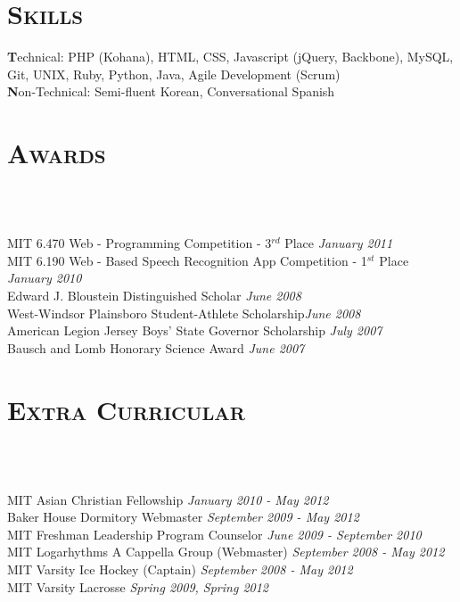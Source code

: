 \begin{resume}
\section{\textsc{Skills}}

\textbf Technical: PHP (Kohana), HTML, CSS, Javascript (jQuery, Backbone), MySQL, Git, UNIX, Ruby, Python, Java, Agile Development (Scrum)\\

\textbf Non-Technical: Semi-fluent Korean, Conversational Spanish

\section{\textsc{Awards}}

\begin{formatb}
  \\
  \body\\
\end{formatb}
MIT 6.470 Web - Programming Competition - 3$^{rd}$ Place \hfill{\em{January 2011}}\\
MIT 6.190 Web - Based Speech Recognition App Competition - 1$^{st}$ Place \hfill{\em{January 2010}}\\
Edward J. Bloustein Distinguished Scholar \hfill{\em{June 2008}}\\
West-Windsor Plainsboro Student-Athlete Scholarship\hfill{\em{June 2008}}\\
American Legion Jersey Boys' State Governor Scholarship \hfill{\em{July 2007}}\\
Bausch and Lomb Honorary Science Award \hfill{\em{June 2007}}

\section{\textsc{Extra Curricular}}
\begin{formatb}
  \\
  \body\\
\end{formatb}
MIT Asian Christian Fellowship \hfill{\em{January 2010 - May 2012}}\\
Baker House Dormitory Webmaster \hfill{\em{September 2009 - May 2012}}\\
MIT Freshman Leadership Program Counselor \hfill{\em{June 2009 - September 2010}}\\
MIT Logarhythms A Cappella Group (Webmaster) \hfill{\em{September 2008 - May 2012}}\\
MIT Varsity Ice Hockey (Captain) \hfill{\em{September 2008 - May 2012}}\\
MIT Varsity Lacrosse \hfill{\em{Spring 2009, Spring 2012}}



\end{resume}
